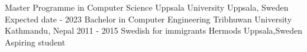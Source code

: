 

\begin{cventries}

  \cventry
    {Master Programme in Computer Science} %
    {Uppsala University } %
    {Uppsala, Sweden} %
    {Expected date - 2023} 
    {}
  \cventry
    {Bachelor in Computer Engineering} %
    {Tribhuwan University } %
    {Kathmandu, Nepal} %
    {2011 - 2015} %
    {}
  \cventry
    {Swedish for immigrants} %
    {Hermods } %
    {Uppsala,Sweden} %
    {} %
    {Aspiring student}
\break
\break
\end{cventries}
